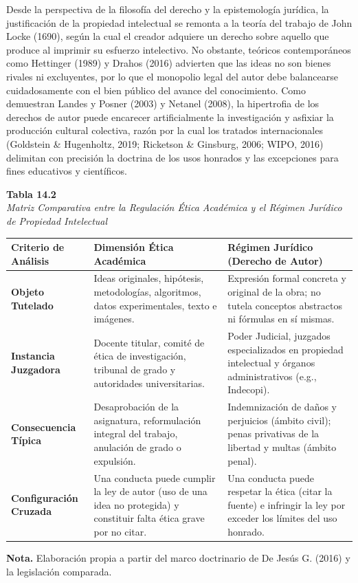 Desde la perspectiva de la filosofía del derecho y la epistemología jurídica, la justificación de la propiedad intelectual se remonta a la teoría del trabajo de John Locke (1690), según la cual el creador adquiere un derecho sobre aquello que produce al imprimir su esfuerzo intelectivo. No obstante, teóricos contemporáneos como Hettinger (1989) y Drahos (2016) advierten que las ideas no son bienes rivales ni excluyentes, por lo que el monopolio legal del autor debe balancearse cuidadosamente con el bien público del avance del conocimiento. Como demuestran Landes y Posner (2003) y Netanel (2008), la hipertrofia de los derechos de autor puede encarecer artificialmente la investigación y asfixiar la producción cultural colectiva, razón por la cual los tratados internacionales (Goldstein \& Hugenholtz, 2019; Ricketson \& Ginsburg, 2006; WIPO, 2016) delimitan con precisión la doctrina de los usos honrados y las excepciones para fines educativos y científicos.

\begin{table}[htbp]
\centering
\small
\renewcommand{\arraystretch}{1.25}
\textbf{Tabla 14.2}\\[0.15cm]
\textit{Matriz Comparativa entre la Regulación Ética Académica y el Régimen Jurídico de Propiedad Intelectual}\\[0.25cm]
\begin{tabularx}{\textwidth}{p{3.2cm}X X}
\toprule
\textbf{Criterio de Análisis} & \textbf{Dimensión Ética Académica} & \textbf{Régimen Jurídico (Derecho de Autor)} \\
\midrule
\textbf{Objeto Tutelado} & Ideas originales, hipótesis, metodologías, algoritmos, datos experimentales, texto e imágenes. & Expresión formal concreta y original de la obra; no tutela conceptos abstractos ni fórmulas en sí mismas. \\
\textbf{Instancia Juzgadora} & Docente titular, comité de ética de investigación, tribunal de grado y autoridades universitarias. & Poder Judicial, juzgados especializados en propiedad intelectual y órganos administrativos (e.g., Indecopi). \\
\textbf{Consecuencia Típica} & Desaprobación de la asignatura, reformulación integral del trabajo, anulación de grado o expulsión. & Indemnización de daños y perjuicios (ámbito civil); penas privativas de la libertad y multas (ámbito penal). \\
\textbf{Configuración Cruzada} & Una conducta puede cumplir la ley de autor (uso de una idea no protegida) y constituir falta ética grave por no citar. & Una conducta puede respetar la ética (citar la fuente) e infringir la ley por exceder los límites del uso honrado. \\
\bottomrule
\end{tabularx}
\vspace{0.15cm}
\raggedright \scriptsize \textbf{Nota.} Elaboración propia a partir del marco doctrinario de De Jesús G. (2016) y la legislación comparada.
\end{table}

